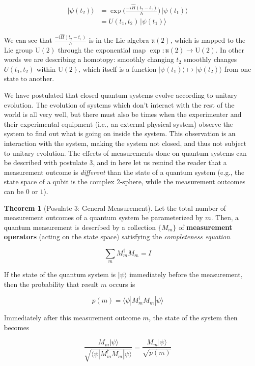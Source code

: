 \documentclass{article}
\theoremstyle{definition}
\newtheorem{theorem}{Theorem}[section]
\begin{document}
    \begin{align*}
      |\psi (t_2) \rangle & = \exp \bigg( \frac{-i \hat{H} (t_2 - t_1)}{\hbar} \bigg) \, |\psi(t_1)\rangle \\
      & = U(t_1, t_2) \, |\psi (t_1) \rangle
    \end{align*}

    We can see that $\frac{-i \hat{H} (t_2 - t_1)}{\hbar}$ is in the Lie algebra $\mathfrak{u}(2)$, which is mapped to the Lie group $\text{U}(2)$ through the exponential map $\exp: \mathfrak{u}(2) \longrightarrow \text{U}(2)$. In other words we are describing a homotopy: smoothly changing $t_2$ smoothly changes $U(t_1, t_2)$ within $\text{U}(2)$, which itself is a function $|\psi (t_1) \rangle \mapsto | \psi (t_2) \rangle$ from one state to another.

    We have postulated that closed quantum systems evolve according to unitary evolution. The evolution of systems which don't interact with the rest of the world is all very well, but there must also be times when the experimenter and their experimental equipment (i.e., an external physical system) observe the system to find out what is going on inside the system. This observation is an interaction with the system, making the system not closed, and thus not subject to unitary evolution. The effects of measurements done on quantum systems can be described with postulate 3, and in here let us remind the reader that a measurement outcome is \textit{different} than the state of a quantum system (e.g., the state space of a qubit is the complex $2$-sphere, while the measurement outcomes can be $0$ or $1$).


    \begin{theorem}[Posulate 3: General Measurement]
      Let the total number of measurement outcomes of a quantum system be parameterized by $m$. Then, a quantum measurement is described by a collection $\{M_m\}$ of \textbf{measurement operators} (acting on the state space) satisfying the \textit{completeness equation}

        \[\sum_{m} M_m^\dagger M_m = I\]

      If the state of the quantum system is $|\psi \rangle$ immediately before the measurement, then the probability that result $m$ occurs is

        \[p(m) = \langle \psi | M_m^\dagger M_m | \psi \rangle\]

      Immediately after this measurement outcome $m$, the state of the system then becomes

        \[\frac{M_m |\psi \rangle}{\sqrt{\langle \psi| M_m^\dagger M_m |\psi \rangle}} = \frac{M_m |\psi \rangle}{\sqrt{p(m)}}\]
    \end{theorem}
\end{document}

